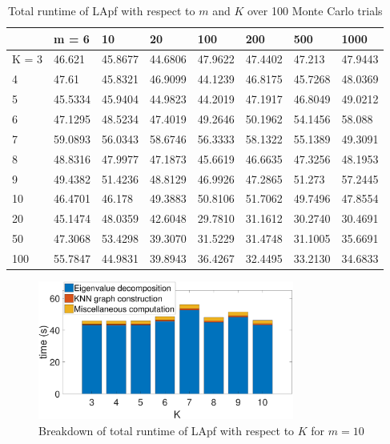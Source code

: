 \documentclass[10pt,letterpaper,final]{article}
\begin{document}
\begin{table}[h!]
\centering
\begin{tabular}{|l|l|l|l|l|l|l|l|}
\hline
      & m = 6   & 10      & 20      & 100     & 200     & 500     & 1000    \\ \hline
K = 3 & 46.621  & 45.8677 & 44.6806 & 47.9622 & 47.4402 & 47.213  & 47.9443 \\ \hline
4     & 47.61   & 45.8321 & 46.9099 & 44.1239 & 46.8175 & 45.7268 & 48.0369 \\ \hline
5     & 45.5334 & 45.9404 & 44.9823 & 44.2019 & 47.1917 & 46.8049 & 49.0212 \\ \hline
6     & 47.1295 & 48.5234 & 47.4019 & 49.2646 & 50.1962 & 54.1456 & 58.088  \\ \hline
7     & 59.0893 & 56.0343 & 58.6746 & 56.3333 & 58.1322 & 55.1389 & 49.3091 \\ \hline
8     & 48.8316 & 47.9977 & 47.1873 & 45.6619 & 46.6635 & 47.3256 & 48.1953 \\ \hline
9     & 49.4382 & 51.4236 & 48.8129 & 46.9926 & 47.2865 & 51.273  & 57.2445 \\ \hline
10    & 46.4701 & 46.178  & 49.3883 & 50.8106 & 51.7062 & 49.7496 & 47.8554 \\ \hline
20    & 45.1474 & 48.0359 & 42.6048 & 29.7810 & 31.1612 & 30.2740 & 30.4691 \\ \hline
50    & 47.3068 & 53.4298 & 39.3070 & 31.5229 & 31.4748 & 31.1005 & 35.6691 \\ \hline
100   & 55.7847 & 44.9831 & 39.8943 & 36.4267 & 32.4495 & 33.2130 & 34.6833 \\ \hline
\end{tabular}
\caption{Total runtime of LApf with respect to $m$ and $K$ over 100 Monte Carlo trials}
\label{tab:runtime_LApf}
\end{table}

\begin{figure}
\centering
\includegraphics[width=0.75\textwidth]{Figures/time_bar_LApf.pdf}
\caption{Breakdown of total runtime of LApf with respect to $K$ for $m=10$}
\label{fig:time_bar_LApf}
\end{figure}
\end{document}
